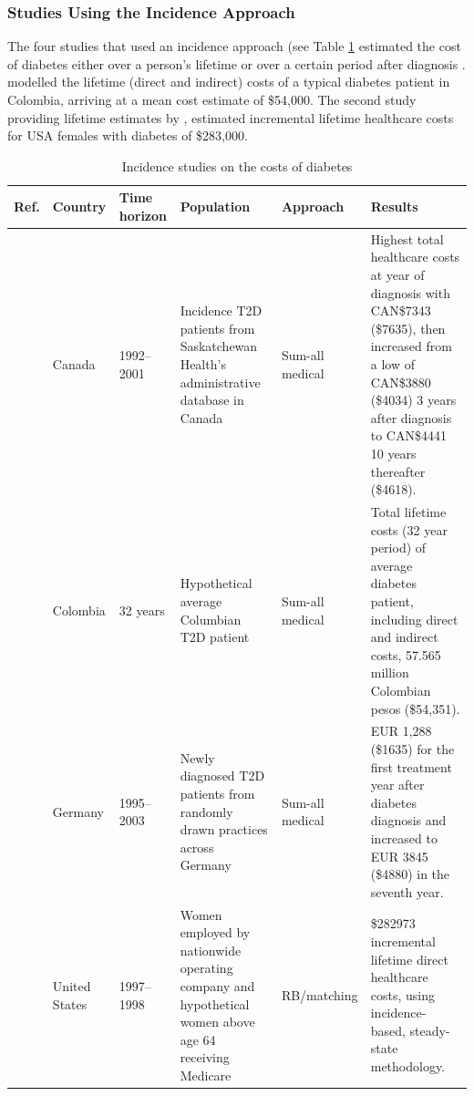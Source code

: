 \documentclass[12pt,english]{article}
\begin{document}
\subsubsection{Studies Using the Incidence Approach}
The four studies that used an incidence approach (see Table \ref{tab:review_incidence} estimated the cost of diabetes either over a person's lifetime \parencite{Gonzalez2009b,Birnbaum2003c} or over a certain period after diagnosis \textcite{Johnson2006d,Martin2007b}. \textcite{Gonzalez2009b} modelled the lifetime (direct and indirect) costs of a typical diabetes patient in Colombia, arriving at a mean cost estimate of \$54,000. The second study providing lifetime estimates by \textcite{Birnbaum2003c}, estimated incremental lifetime healthcare costs for USA females with diabetes of \$283,000.


\begin{table}[hp]
\centering
\footnotesize
\begin{tabularx}{\linewidth}{X X X X X X}
\caption{Incidence studies on the costs of diabetes}\label{tab:review_incidence}\\
\toprule
Ref. &  Country & Time horizon & Population & Approach & Results \\ 
\midrule 
\textcite{Johnson2006d} &  Canada & 1992--2001 & Incidence T2D patients from Saskatchewan Health's administrative database in Canada & Sum-all medical & Highest  total healthcare costs at year of diagnosis with CAN\$7343 (\$7635), then increased from a low of CAN\$3880 (\$4034) 3 years after diagnosis to CAN\$4441   10 years thereafter (\$4618). \\
	\textcite{Gonzalez2009b} & Colombia & 32 years & Hypothetical average Columbian T2D patient & Sum-all medical & Total lifetime costs (32 year  period) of average diabetes patient, including direct and indirect costs,  57.565 million Colombian pesos (\$54,351). \\
\textcite{Martin2007b} & Germany & 1995--2003 & Newly  diagnosed T2D patients from randomly drawn practices across Germany & Sum-all medical & EUR 1,288   (\$1635) for the first treatment year after diabetes diagnosis and increased   to EUR 3845 (\$4880) in the seventh year. \\
\textcite{Birnbaum2003c} & United  States & 1997--1998 & Women employed by nationwide operating company and hypothetical women above age 64 receiving Medicare & RB/matching & \$282973 incremental lifetime direct healthcare costs, using incidence-based, steady-state methodology. \\ \bottomrule
\end{tabularx}
\end{table}
\end{document}
